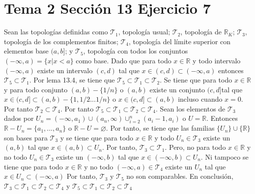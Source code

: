 \documentclass{article}
\begin{document}
\section{Tema 2 Sección 13 Ejercicio 7}
Sean las topologías definidas como $\mathcal{T}_1$, topología usual;
$\mathcal{T}_2$, topología de $\mathbb{R}_K$; $\mathcal{T}_3$, topología de los complementos finitos; $\mathcal{T}_4$, topología del límite superior con elementos base $(a,b]$; y $\mathcal{T}_5$, topología con todos los conjuntos $(-\infty,a)=\{x|x<a\}$ como base.
Dado que para todo $x\in \mathbb{R}$ y todo intervalo $(-\infty,a)$ existe un intervalo $(c,d)$ tal que $x\in (c,d)\subset (-\infty,a)$ entonces $\mathcal{T}_5\subset \mathcal{T}_1$. Por lema 13.4, se tiene que $\mathcal{T}_5\subset \mathcal{T}_1\subset \mathcal{T}_2$. Se tiene que para todo $x\in \mathbb{R}$ y para todo conjunto $(a,b)-\{1/n\}$ o $(a,b)$ existe un conjunto $(c,d]$tal que $x\in (c,d]\subset(a,b)-\{1, 1/2...1/n\}$ o $x\in (c,d]\subset(a,b)$ incluso cuando $x=0$. Por tanto $\mathcal{T}_2\subset\mathcal{T}_4$. Por tanto $\mathcal{T}_5\subset\mathcal{T}_1\subset \mathcal{T}_2\subset\mathcal{T}_4$. Sean los elementos de $\mathcal{T}_3$ dados por $U_n=(-\infty,a_1)\cup(a_n,\infty)\cup_{i=2}^n(a_i-1,a_i)$ o $U=\mathbb{R}$. Entonces $\mathbb{R}-U_n=\{a_1,...,a_n\}$  o $\mathbb{R}-U=\varnothing$. Por tanto, se tiene que las familias $\{U_n\}\cup\{\mathbb{R}\}$ son bases para $\mathcal{T}_3$ y se tiene que para todo $x\in \mathbb{R}$ y todo $U_n\in\mathcal{T}_3$ existe un $(a,b)$ tal que $x\in(a,b)\subset U_n $. Por tanto, $\mathcal{T}_3\subset \mathcal{T}_1$. Pero, no para todo $x\in \mathbb{R}$ y no todo $U_n\in\mathcal{T}_3$ existe un $(-\infty,b)$ tal que $x\in(-\infty,b)\subset U_n $. Ni tampoco se tiene que para todo $x\in \mathbb{R}$ y no todo $(-\infty,a)\in\mathcal{T}_4$ existe un $U_n$ tal que $x\in U_n\subset (-\infty,a) $ Por tanto, $\mathcal{T}_3$ y $\mathcal{T}_5$ no son comparables. En conclusión,  $\mathcal{T}_3\subset \mathcal{T}_1\subset \mathcal{T}_2\subset\mathcal{T}_4$ y $\mathcal{T}_5\subset \mathcal{T}_1\subset \mathcal{T}_2\subset\mathcal{T}_4$
\end{document}

